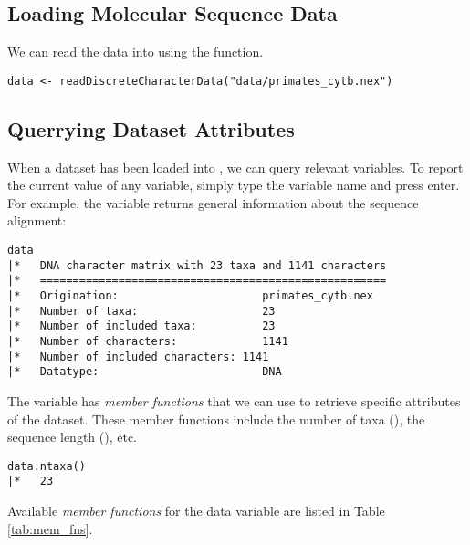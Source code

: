 \subsection{Loading Molecular Sequence Data}
We can read the data into \RevBayes  using the  function. 
{\tt \begin{snugshade*}
\begin{lstlisting}
data <- readDiscreteCharacterData("data/primates_cytb.nex")
\end{lstlisting}
\end{snugshade*}}

\subsection{Querrying Dataset Attributes}
When a dataset has been loaded into \RevBayes, we can query relevant \Rev variables. 
To report the current value of any variable, simply type the variable name and press enter. 
For example, the  variable returns general information about the sequence alignment:
{\tt \begin{snugshade*}
\begin{lstlisting}
data
|*   DNA character matrix with 23 taxa and 1141 characters
|*   =====================================================
|*   Origination:                      primates_cytb.nex
|*   Number of taxa:                   23
|*   Number of included taxa:          23
|*   Number of characters:             1141
|*   Number of included characters: 1141
|*   Datatype:                         DNA
\end{lstlisting}
\end{snugshade*}}

The  variable has \textit{member functions} that we can use to retrieve specific attributes of the dataset. 
These member functions include the number of taxa (), the sequence length (), etc.
{\tt \begin{snugshade*}
\begin{lstlisting}
data.ntaxa()
|*   23
\end{lstlisting}
\end{snugshade*}}

Available \textit{member functions} for the data variable are listed in Table \ref{tab:mem_fns}.


